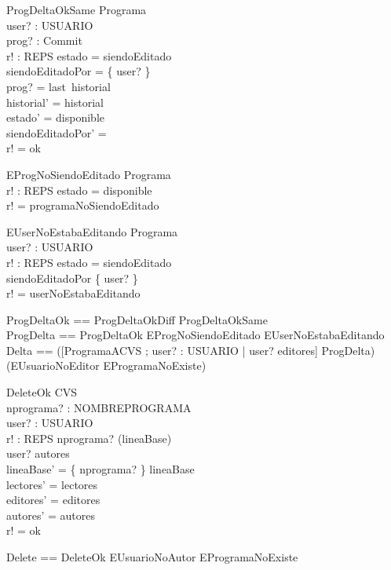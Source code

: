 \documentclass[11pt]{article}
\begin{document}
  \begin{schema}{ProgDeltaOkSame}
  \Delta Programa \\
  user? : USUARIO \\
  prog? : Commit \\
  r! : REPS 
  \where
  estado = siendoEditado \\
  siendoEditadoPor = \{ user? \} \\
  prog? = last~historial \\
  historial' = historial \\
  estado' = disponible \\
  siendoEditadoPor' = \emptyset \\
  r! = ok
  \end{schema}
  
  \begin{schema}{EProgNoSiendoEditado}
  \Xi Programa \\
  r! : REPS
  \where
  estado = disponible \\
  r! = programaNoSiendoEditado
  \end{schema}
  
  \begin{schema}{EUserNoEstabaEditando}
  \Xi Programa \\
  user? : USUARIO \\
  r! : REPS
  \where
  estado = siendoEditado \\
  siendoEditadoPor \neq \{ user? \} \\
  r! = userNoEstabaEditando
  \end{schema}
  
  \begin{zed}
  ProgDeltaOk == ProgDeltaOkDiff \lor ProgDeltaOkSame \\
  ProgDelta == ProgDeltaOk \lor EProgNoSiendoEditado \lor EUserNoEstabaEditando \\
  Delta == ([ProgramaACVS ; user? : USUARIO | user? \in editores] \land ProgDelta) \lor \\
  (EUsuarioNoEditor \lor EProgramaNoExiste)
  \end{zed}
  
  \begin{schema}{DeleteOk}
  \Delta CVS \\
  nprograma? : NOMBREPROGRAMA \\
  user? : USUARIO \\
  r! : REPS
  \where
  nprograma? \in (\dom lineaBase) \\
  user? \in autores \\
  lineaBase' =  \{ nprograma? \} \ndres lineaBase  \\
  lectores' = lectores \\
  editores' = editores \\
  autores' = autores \\
  r! = ok
  \end{schema}
  
  \begin{zed}
  Delete == DeleteOk \lor EUsuarioNoAutor \lor EProgramaNoExiste
  \end{zed}
\end{document}
